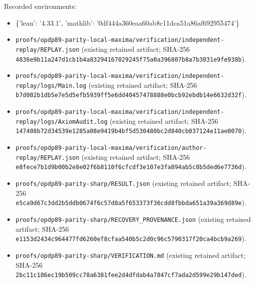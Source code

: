 \documentclass[11pt,a4paper]{article}
\begin{document}
Recorded environments:

\begin{itemize}
\item \{'lean': '4.33.1', 'mathlib': '0df444a360eaa60ab8c11dca51a86af692955474'\}
\end{itemize}
\begin{itemize}
\item \texttt{proofs/opdp89-parity-local-maxima/verification/independent-replay/REPLAY.json} (existing retained artifact; SHA-256 \texttt{4836e9b11a247d1cb1b4a83294167029245f75a0a396807b8a7b3031e9fe938b}).
\end{itemize}
\begin{itemize}
\item \texttt{proofs/opdp89-parity-local-maxima/verification/independent-replay/logs/Main.log} (existing retained artifact; SHA-256 \texttt{b7d002b1db5e7e5d5efb5939ff5e6dd40457478888e0bcb92ebdb14e6632d32f}).
\end{itemize}
\begin{itemize}
\item \texttt{proofs/opdp89-parity-local-maxima/verification/independent-replay/logs/AxiomAudit.log} (existing retained artifact; SHA-256 \texttt{147408b72d34539e1285a08e9419b4bf5d530480bc2d840cb037124e11ae0070}).
\end{itemize}
\begin{itemize}
\item \texttt{proofs/opdp89-parity-local-maxima/verification/author-replay/REPLAY.json} (existing retained artifact; SHA-256 \texttt{e8fece7b1d9b00b2e8e02f6b8110f6cfcdf3e107e3fa894ab5c8b5ded6e7736d}).
\end{itemize}
\begin{itemize}
\item \texttt{proofs/opdp89-parity-sharp/RESULT.json} (existing retained artifact; SHA-256 \texttt{e5ca9d67c3dd2b5ddb0674f6c57d8a5f653373f36cdd8fbbda651a39a369d89e}).
\end{itemize}
\begin{itemize}
\item \texttt{proofs/opdp89-parity-sharp/RECOVERY\_PROVENANCE.json} (existing retained artifact; SHA-256 \texttt{e1153d2434c964477fd6260ef8cfaa540b5c2d0c96c5790317f20ca4bcb9a269}).
\end{itemize}
\begin{itemize}
\item \texttt{proofs/opdp89-parity-sharp/VERIFICATION.md} (existing retained artifact; SHA-256 \texttt{2bc11c186ec19b509cc78a6381fee2d4dfdab4a7847cf7ada2d599e29b147ded}).
\end{itemize}
\end{document}
